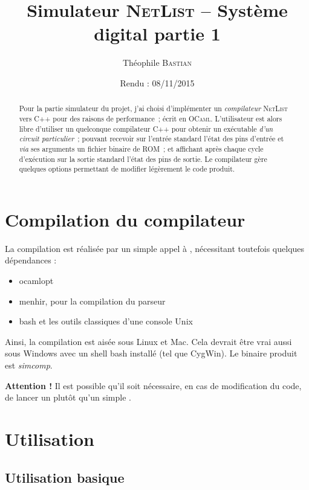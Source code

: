 \documentclass[11pt,a4paper]{article}
\title{Simulateur \textsc{NetList} -- Système digital partie 1}
\date{Rendu : 08/11/2015}
\author{Théophile \textsc{Bastian}}
\begin{document}
\maketitle

\begin{abstract}
Pour la partie \og simulateur \fg{} du projet, j'ai choisi d'implémenter un \emph{compilateur} \textsc{NetList} vers C++ pour des raisons de performance~; écrit en \textsc{OCaml}. L'utilisateur est alors libre d'utiliser un quelconque compilateur C++ pour obtenir un exécutable \emph{d'un circuit particulier}~; pouvant recevoir sur l'entrée standard l'état des pins d'entrée et \textit{via} ses arguments un fichier binaire de ROM~; et affichant après chaque cycle d'exécution sur la sortie standard l'état des pins de sortie. Le compilateur gère quelques options permettant de modifier légèrement le code produit.
\end{abstract}

\section{Compilation du compilateur}

La compilation est réalisée par un simple appel à , nécessitant toutefois quelques dépendances :
\begin{itemize}
\item ocamlopt
\item menhir, pour la compilation du parseur
\item bash et les outils classiques d'une console Unix
\end{itemize}

Ainsi, la compilation est aisée sous Linux et Mac. Cela devrait être vrai aussi sous Windows avec un shell bash installé (tel que CygWin). Le binaire produit est \emph{simcomp}.

\textbf{Attention !} Il est possible qu'il soit nécessaire, en cas de modification du code, de lancer un  plutôt qu'un simple .

\section{Utilisation}

\subsection{Utilisation basique}
\end{document}
